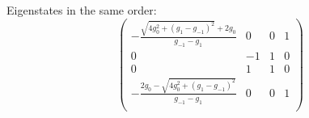 \documentclass[12pt,a4paper]{book}
\theoremstyle{definition}
\begin{document}
Eigenstates in the same order:
\begin{equation}
	\left(
	\begin{array}{cccc}
		-\frac{\sqrt{4 g_0^2+(g_1-g_{-1})^2}+2 g_0}{g_{-1}-g_1} & 0 & 0 & 1 \\
		0 & -1 & 1 & 0 \\
		0 & 1 & 1 & 0 \\
		-\frac{2 g_0-\sqrt{4 g_0^2+(g_1-g_{-1})^2}}{g_{-1}-g_1} & 0 & 0 & 1 \\
	\end{array}
	\right)
\end{equation}
\end{document}

